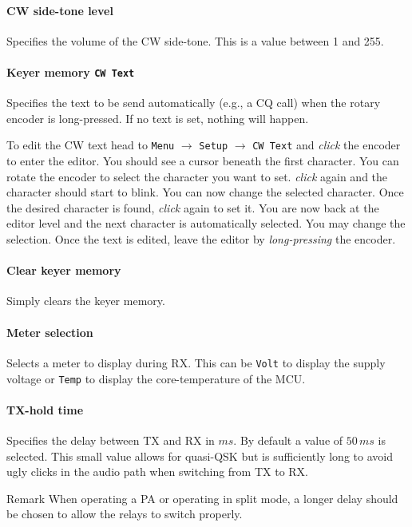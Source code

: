 \documentclass[10pt, a4paper,twoside,openright]{scrartcl}
\newenvironment{remark}{\begin{bclogo}[couleur=blue!30,arrondi=.1,logo=\bcinfo,ombre=true]{Remark}}{\end{bclogo}}
\begin{document}
\paragraph{CW side-tone level}
Specifies the volume of the CW side-tone. This is a value between 1 and 255.

\paragraph{Keyer memory \texttt{CW Text}}
Specifies the text to be send automatically (e.g., a CQ call) when the rotary encoder is long-pressed. If no text is set, nothing will happen.

To edit the CW text head to \texttt{Menu} $\rightarrow$ \texttt{Setup} $\rightarrow$ \texttt{CW Text} and \emph{click} the encoder to enter the editor. You should see a cursor beneath the first character. You can rotate the encoder to select the character you want to set. \emph{click} again and the character should start to blink. You can now change the selected character. Once the desired character is found, \emph{click} again to set it. You are now back at the editor level and the next character is automatically selected. You may change the selection. Once the text is edited, leave the editor by \emph{long-pressing} the encoder.

\paragraph{Clear keyer memory}
Simply clears the keyer memory.

\paragraph{Meter selection}
Selects a meter to display during RX. This can be \texttt{Volt} to display the supply voltage or \texttt{Temp} to display the core-temperature of the MCU.

\paragraph{TX-hold time}
Specifies the delay between TX and RX in $ms$. By default a value of $50\,ms$ is selected. This small value allows for quasi-QSK but is sufficiently long to avoid ugly clicks in the audio path when switching from TX to RX.
\begin{remark}
When operating a PA or operating in split mode, a longer delay should be chosen to allow the relays to switch properly.
\end{remark}
\end{document}
